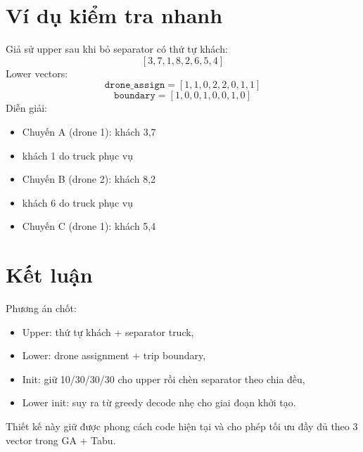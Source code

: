 \documentclass[12pt,a4paper]{article}
\begin{document}
\section{Ví dụ kiểm tra nhanh}
Giả sử upper sau khi bỏ separator có thứ tự khách:
\[
[3,7,1,8,2,6,5,4]
\]
Lower vectors:
\[
\texttt{drone\_assign}=[1,1,0,2,2,0,1,1]
\]
\[
\texttt{boundary}=[1,0,0,1,0,0,1,0]
\]
Diễn giải:
\begin{itemize}[leftmargin=1.2cm]
    \item Chuyến A (drone 1): khách 3,7
    \item khách 1 do truck phục vụ
    \item Chuyến B (drone 2): khách 8,2
    \item khách 6 do truck phục vụ
    \item Chuyến C (drone 1): khách 5,4
\end{itemize}

\section{Kết luận}
Phương án chốt:
\begin{itemize}[leftmargin=1.2cm]
    \item Upper: thứ tự khách + separator truck,
    \item Lower: drone assignment + trip boundary,
    \item Init: giữ 10/30/30/30 cho upper rồi chèn separator theo chia đều,
    \item Lower init: suy ra từ greedy decode nhẹ cho giai đoạn khởi tạo.
\end{itemize}
Thiết kế này giữ được phong cách code hiện tại và cho phép tối ưu đầy đủ theo 3 vector trong GA + Tabu.
\end{document}
